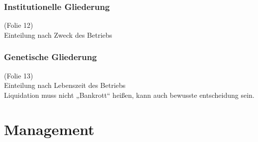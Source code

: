 \subsubsection{Institutionelle Gliederung}
(Folie 12)\\
Einteilung nach Zweck des Betriebs

\subsubsection{Genetische Gliederung}
(Folie 13)\\
Einteilung nach Lebenszeit des Betriebs\\
Liquidation muss nicht „Bankrott“ heißen, kann auch bewusste entscheidung sein.

\section{Management}
